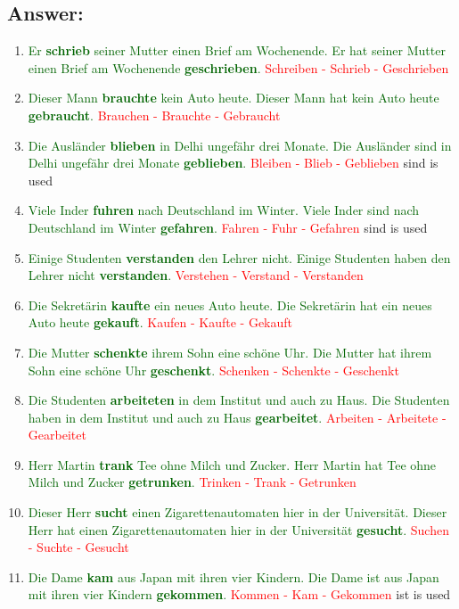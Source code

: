 \documentclass[12pt]{article}
\begin{document}
\subsection*{Answer:}
\begin{enumerate}
\item \textcolor{darkgreen}{Er \textbf{schrieb} seiner Mutter einen Brief am Wochenende. Er hat seiner Mutter einen Brief am Wochenende \textbf{geschrieben}.} \textcolor{red}{Schreiben - Schrieb - Geschrieben}
\item \textcolor{darkgreen}{Dieser Mann \textbf{brauchte} kein Auto heute. Dieser Mann hat kein Auto heute \textbf{gebraucht}.} \textcolor{red}{Brauchen - Brauchte - Gebraucht}
\item \textcolor{darkgreen}{Die Ausländer \textbf{blieben} in Delhi ungefähr drei Monate. Die Ausländer sind in Delhi ungefähr drei Monate \textbf{geblieben}.} \textcolor{red}{Bleiben - Blieb - Geblieben} {sind is used}
\item \textcolor{darkgreen}{Viele Inder \textbf{fuhren} nach Deutschland im Winter. Viele Inder sind nach Deutschland im Winter \textbf{gefahren}.} \textcolor{red}{Fahren - Fuhr - Gefahren} {sind is used}
\item \textcolor{darkgreen}{Einige Studenten \textbf{verstanden} den Lehrer nicht. Einige Studenten haben den Lehrer nicht \textbf{verstanden}.} \textcolor{red}{Verstehen - Verstand - Verstanden}
\item \textcolor{darkgreen}{Die Sekretärin \textbf{kaufte} ein neues Auto heute. Die Sekretärin hat ein neues Auto heute \textbf{gekauft}.} \textcolor{red}{Kaufen - Kaufte - Gekauft}
\item \textcolor{darkgreen}{Die Mutter \textbf{schenkte} ihrem Sohn eine schöne Uhr. Die Mutter hat ihrem Sohn eine schöne Uhr \textbf{geschenkt}.} \textcolor{red}{Schenken - Schenkte - Geschenkt}
\item \textcolor{darkgreen}{Die Studenten \textbf{arbeiteten} in dem Institut und auch zu Haus. Die Studenten haben in dem Institut und auch zu Haus \textbf{gearbeitet}.} \textcolor{red}{Arbeiten - Arbeitete - Gearbeitet}
\item \textcolor{darkgreen}{Herr Martin \textbf{trank} Tee ohne Milch und Zucker. Herr Martin hat Tee ohne Milch und Zucker \textbf{getrunken}.} \textcolor{red}{Trinken - Trank - Getrunken}
\item \textcolor{darkgreen}{Dieser Herr \textbf{sucht} einen Zigarettenautomaten hier in der Universität. Dieser Herr hat einen Zigarettenautomaten hier in der Universität \textbf{gesucht}.} \textcolor{red}{Suchen - Suchte - Gesucht}
\item \textcolor{darkgreen}{Die Dame \textbf{kam} aus Japan mit ihren vier Kindern. Die Dame ist aus Japan mit ihren vier Kindern \textbf{gekommen}.} \textcolor{red}{Kommen - Kam - Gekommen} {ist is used}
\end{enumerate}
\end{document}
